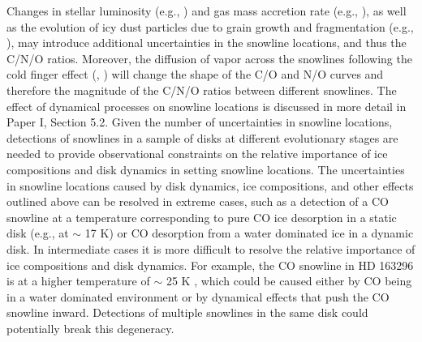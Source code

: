 \documentclass[apj]{emulateapj}
\begin{document}
Changes in stellar luminosity (e.g., \citealt{kennedy06}) and gas mass accretion rate (e.g., \citealt{chambers09}), as well as the evolution of icy dust particles due to grain growth and fragmentation (e.g., \citealt{birnstiel12}), may introduce additional uncertainties in the snowline locations, and thus the C/N/O ratios. Moreover, the diffusion of vapor across the snowlines following the cold finger effect (\citealt{stevenson88}, \citealt{cyr98}) will change the shape of the C/O and N/O curves and therefore the magnitude of the C/N/O ratios between different snowlines. The effect of dynamical processes on snowline locations is discussed in more detail in Paper I, Section 5.2. Given the number of uncertainties in snowline locations, detections of snowlines in a sample of disks at different evolutionary stages are needed to provide observational constraints on the relative importance of ice compositions and disk dynamics in setting snowline locations. The uncertainties in snowline locations caused by disk dynamics, ice compositions, and other effects outlined above can be resolved in extreme cases, such as a detection of a CO snowline at a temperature corresponding to pure CO ice desorption in a static disk (e.g., \citealt{qi13} at $\sim$ 17 K) or CO desorption from a water dominated ice in a dynamic disk. In intermediate cases it is more difficult to resolve the relative importance of ice compositions and disk dynamics. For example, the CO snowline in HD 163296 is at a higher temperature of $\sim$ 25 K \citep{qi15}, which could be caused either by CO being in a water dominated environment or by dynamical effects that push the CO snowline inward. Detections of multiple snowlines in the same disk could potentially break this degeneracy. %

\end{document}
